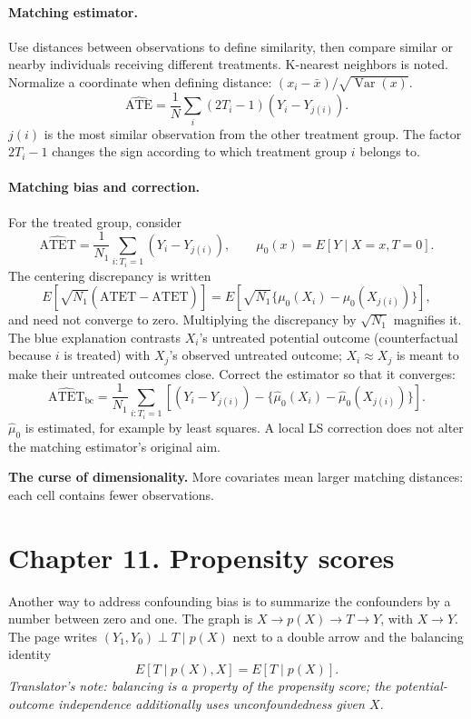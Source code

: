 \paragraph{Matching estimator.}
Use distances between observations to define similarity, then compare similar or nearby individuals receiving different treatments. K-nearest neighbors is noted. Normalize a coordinate when defining distance: $(x_i-\bar x)/\sqrt{\operatorname{Var}(x)}$.
\[\widehat{\mathrm{ATE}}=\frac1N\sum_i(2T_i-1)(Y_i-Y_{j(i)}).\]
$j(i)$ is the most similar observation from the other treatment group. The factor $2T_i-1$ changes the sign according to which treatment group $i$ belongs to.

\paragraph{Matching bias and correction.}
For the treated group, consider
\[\widehat{\mathrm{ATET}}=\frac1{N_1}\sum_{i:T_i=1}(Y_i-Y_{j(i)}),\qquad
\mu_0(x)=E[Y\mid X=x,T=0].\]
The centering discrepancy is written
\[E[\sqrt{N_1}(\widehat{\mathrm{ATET}}-\mathrm{ATET})]
=E[\sqrt{N_1}\{\mu_0(X_i)-\mu_0(X_{j(i)})\}],\]
and need not converge to zero. Multiplying the discrepancy by $\sqrt{N_1}$ magnifies it. The blue explanation contrasts $X_i$'s untreated potential outcome (counterfactual because $i$ is treated) with $X_j$'s observed untreated outcome; $X_i\approx X_j$ is meant to make their untreated outcomes close. Correct the estimator so that it converges:
\[\widehat{\mathrm{ATET}}_{\mathrm{bc}}=
\frac1{N_1}\sum_{i:T_i=1}\left[(Y_i-Y_{j(i)})-
\{\hat\mu_0(X_i)-\hat\mu_0(X_{j(i)})\}\right].\]
$\hat\mu_0$ is estimated, for example by least squares. A local LS correction does not alter the matching estimator's original aim.

\textbf{The curse of dimensionality.} More covariates mean larger matching distances: each cell contains fewer observations.

\section{Chapter 11. Propensity scores}
Another way to address confounding bias is to summarize the confounders by a number between zero and one. The graph is $X\to p(X)\to T\to Y$, with $X\to Y$. The page writes $(Y_1,Y_0)\perp T\mid p(X)$ next to a double arrow and the balancing identity
\[E[T\mid p(X),X]=E[T\mid p(X)].\]
\textit{Translator's note: balancing is a property of the propensity score; the potential-outcome independence additionally uses unconfoundedness given $X$.}

